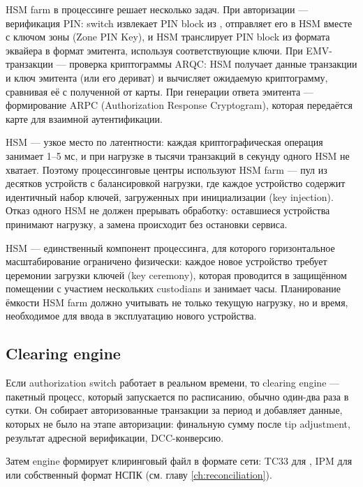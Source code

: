 HSM farm в процессинге решает несколько задач. При авторизации — верификация PIN: switch извлекает PIN block из
, отправляет его в HSM вместе с ключом зоны (Zone PIN Key), и HSM транслирует PIN block из формата эквайера в
формат эмитента, используя соответствующие ключи. При EMV-транзакции — проверка криптограммы ARQC: HSM получает данные
транзакции и ключ эмитента (или его дериват) и вычисляет ожидаемую криптограмму, сравнивая её с полученной от карты.
При генерации ответа эмитента — формирование ARPC (Authorization Response Cryptogram), которая передаётся карте для
взаимной аутентификации.

HSM — узкое место по латентности: каждая криптографическая операция занимает 1--5 мс, и при нагрузке в тысячи
транзакций в секунду одного HSM не хватает. Поэтому процессинговые центры используют HSM farm — пул из десятков
устройств с балансировкой нагрузки, где каждое устройство содержит идентичный набор ключей, загруженных при
инициализации (key injection). Отказ одного HSM не должен прерывать обработку: оставшиеся устройства принимают
нагрузку, а замена происходит без остановки сервиса.

\begin{kaobox}[title=Важно, colback=red!5, colbacktitle=red!20]
  HSM — единственный компонент процессинга, для которого
  горизонтальное масштабирование ограничено физически: каждое
  новое устройство требует церемонии загрузки ключей
  (key ceremony), которая проводится в защищённом помещении
  с участием нескольких custodians и занимает часы. Планирование
  ёмкости HSM farm должно учитывать не только текущую нагрузку,
  но и время, необходимое для ввода в эксплуатацию нового
  устройства.
\end{kaobox}

\subsection*{Clearing engine}

Если authorization switch работает в реальном времени,
то clearing engine — пакетный процесс, который запускается
по расписанию, обычно один-два раза в сутки. Он собирает
авторизованные транзакции за период и добавляет данные,
которых не было на этапе авторизации: финальную сумму после
tip adjustment, результат адресной верификации, DCC-конверсию.

Затем engine формирует клиринговый файл в формате сети:
TC33 для , IPM для 
или собственный формат НСПК (см. главу \ref{ch:reconciliation}).

